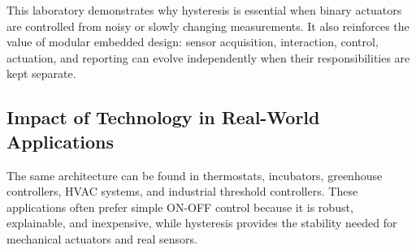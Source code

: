 This laboratory demonstrates why hysteresis is essential when binary actuators are controlled from noisy or slowly changing measurements. It also reinforces the value of modular embedded design: sensor acquisition, interaction, control, actuation, and reporting can evolve independently when their responsibilities are kept separate.

\subsection{Impact of Technology in Real-World Applications}

The same architecture can be found in thermostats, incubators, greenhouse controllers, HVAC systems, and industrial threshold controllers. These applications often prefer simple ON-OFF control because it is robust, explainable, and inexpensive, while hysteresis provides the stability needed for mechanical actuators and real sensors.
